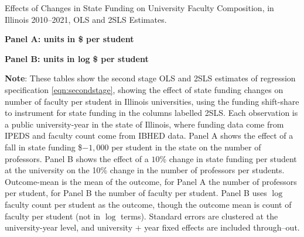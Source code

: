 \newpage
\begin{table}[H]
    \singlespacing
    \centering
    \caption{Effects of Changes in State Funding on University Faculty Composition, in Illinois 2010--2021, OLS and 2SLS Estimates.}

    \textbf{Panel A: units in \$ per student}

    \makebox[\textwidth][c]{}
    
    \textbf{Panel B: units in log \$ per student}
    
    \makebox[\textwidth][c]{}

    \label{tab:facultycount-illinois-reg}
    \justify
    \footnotesize
    \textbf{Note}:
    These tables show the second stage OLS and 2SLS estimates of regression specification \eqref{eqn:secondstage}, showing the effect of state funding changes on number of faculty per student in Illinois universities, using the funding shift-share to instrument for state funding in the columns labelled 2SLS.
    Each observation is a public university-year in the state of Illinois, where funding data come from IPEDS and faculty count come from IBHED data.
    Panel A shows the effect of a fall in state funding \$$-1,000$ per student in the state on the number of professors.
    Panel B shows the effect of a $10$\% change in state funding per student at the university on the 10\% change in the number of professors per students.
    Outcome-mean is the mean of the outcome, for Panel A the number of professors per student, for Panel B the number of faculty per student.
    Panel B uses $\log$ faculty count per student as the outcome, though the outcome mean is count of faculty per student (not in $\log$ terms).
    Standard errors are clustered at the university-year level, and university $+$ year fixed effects are included through--out.
\end{table}

